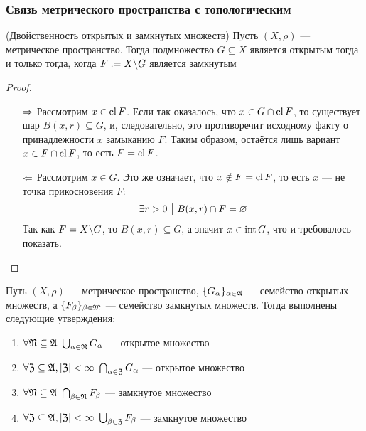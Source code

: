 \subsubsection*{Связь метрического пространства с топологическим}

\begin{theorem} (Двойственность открытых и замкнутых множеств)
	Пусть $(X, \rho)$ --- метрическое пространство. Тогда подмножество $G \subseteq X$ является открытым тогда и только тогда, когда $F := X \backslash G$ является замкнутым
\end{theorem}

\begin{proof}~
	\begin{itemize}
		\item[$\Rightarrow$] Рассмотрим $x \in \operatorname{cl} F$. Если так оказалось, что $x \in G \cap \operatorname{cl} F$, то существует шар $B(x, r) \subseteq G$, и, следовательно, это противоречит исходному факту о принадлежности $x$ замыканию $F$. Таким образом, остаётся лишь вариант $x \in F \cap \operatorname{cl} F$, то есть $F = \operatorname{cl} F$.
		
		\item[$\Leftarrow$] Рассмотрим $x \in G$. Это же означает, что $x \notin F = \operatorname{cl} F$, то есть $x$ --- не точка прикосновения $F$:
		\[
			\exists r > 0 \ \big|\  B(x, r) \cap F = \varnothing
		\]
		Так как $F = X \backslash G$, то $B(x, r) \subseteq G$, а значит $x \in \operatorname{int} G$, что и требовалось показать.
	\end{itemize}
\end{proof}

\begin{theorem}
	Путь $(X, \rho)$ --- метрическое пространство, $\{G_\alpha\}_{\alpha \in \mathfrak{A}}$ --- семейство открытых множеств, а $\{F_\beta\}_{\beta \in \mathfrak{M}}$ --- семейство замкнутых множеств. Тогда выполнены следующие утверждения:
	\begin{enumerate}
		\item $\forall \gN \subseteq \gA\ \bigcup_{\alpha \in \gN} G_\alpha$ --- открытое множество
		
		\item $\forall \mathfrak{Z} \subseteq \mathfrak{A}, |\mathfrak{Z}| < \infty\ \bigcap_{\alpha \in \mathfrak{Z}} G_\alpha$ --- открытое множество
		
		\item $\forall \gN \subseteq \gA\ \bigcap_{\beta \in \gN} F_\beta$ --- замкнутое множество
		
		\item $\forall \mathfrak{Z} \subseteq \mathfrak{A}, |\mathfrak{Z}| < \infty\ \bigcup_{\beta \in \mathfrak{Z}} F_\beta$ --- замкнутое множество
	\end{enumerate}
\end{theorem}

